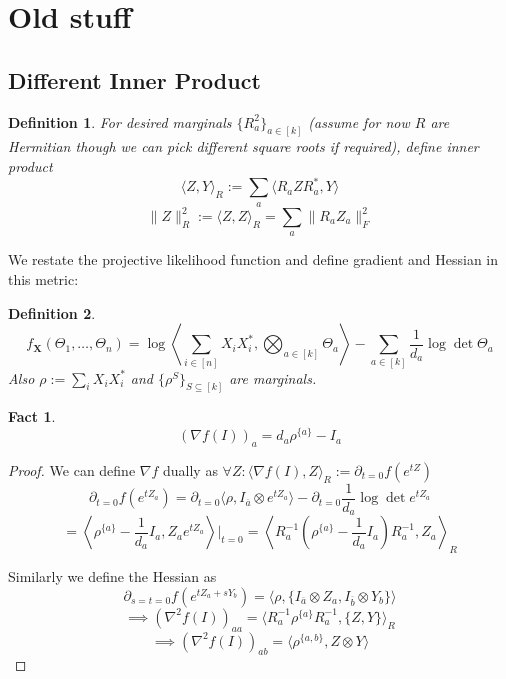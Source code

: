 \documentclass{article}
\newtheorem{fact}[theorem]{Fact}
\newtheorem{definition}{Definition}
\renewcommand{\vec}{\bm}
\begin{document}
\section{Old stuff}

\subsection{Different Inner Product}

\begin{definition}
For desired marginals $\{R_{a}^{2}\}_{a \in [k]}$ (assume for now $R$ are Hermitian though we can pick different square roots if required), define inner product
\[ \langle Z, Y \rangle_{R} := \sum_{a} \langle R_{a} Z R_{a}^{*}, Y \rangle \]
\[ \|Z\|_{R}^{2} := \langle Z, Z \rangle_{R} = \sum_{a} \|R_{a} Z_{a}\|_{F}^{2}   \]
\end{definition}

We restate the projective likelihood function and define gradient and Hessian in this metric:

\begin{definition}
\[ f_{\vec X}(\Theta_1, \dots, \Theta_n) = \log \left\langle \sum_{i \in [n]} X_{i} X_{i}^{*},  \bigotimes_{a \in [k]} \Theta_a \right\rangle - \sum_{a \in [k]} \frac{1}{d_a} \log\det \Theta_a  \]
Also $\rho := \sum_{i} X_{i} X_{i}^{*}$ and $\{\rho^{S}\}_{S \subseteq [k]}$ are marginals.
\end{definition}

\begin{fact}
\[ (\nabla f(I))_{a} = d_{a} \rho^{\{a\}} - I_{a}  \]
\end{fact}
\begin{proof}
We can define $\nabla f$ dually as $\forall Z: \langle \nabla f(I), Z \rangle_{R} := \partial_{t=0} f(e^{tZ})$
\[ \partial_{t=0} f(e^{t Z_{a}}) = \partial_{t=0} \langle \rho, I_{\overline{a}} \otimes e^{tZ_{a}}  \rangle - \partial_{t=0} \frac{1}{d_{a}} \log\det e^{t Z_{a}}  \]
\[ = \left\langle \rho^{\{a\}} - \frac{1}{d_{a}} I_{a}, Z_{a} e^{t Z_{a}} \right\rangle|_{t=0} = \left\langle R_{a}^{-1} \left( \rho^{\{a\}} - \frac{1}{d_{a}} I_{a} \right) R_{a}^{-1}, Z_{a} \right\rangle_{R}   \]

Similarly we define the Hessian as
\[ \partial_{s=t=0} f(e^{tZ_{a} + sY_{b}}) = \langle \rho, \{ I_{\overline{a}} \otimes Z_{a}, I_{\overline{b}} \otimes Y_{b} \} \rangle   \]
\[ \implies (\nabla^{2} f(I))_{aa} = \langle R_{a}^{-1} \rho^{\{a\}} R_{a}^{-1}, \{Z, Y\} \rangle_{R}    \]
\[ \implies (\nabla^{2} f(I))_{ab} = \langle \rho^{\{a,b\}}, Z \otimes Y \rangle   \]
\end{proof}
\end{document}
